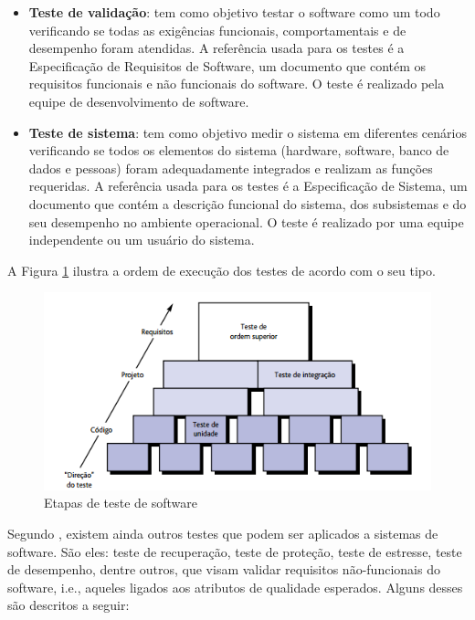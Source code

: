 \begin{itemize}
\item {\textbf{Teste de validação}}: tem como objetivo testar o software como um todo verificando se todas as exigências funcionais, comportamentais e de desempenho foram atendidas. A referência usada para os testes é a Especificação de Requisitos de Software, um documento que contém os requisitos funcionais e não funcionais do software. O teste é realizado pela equipe de desenvolvimento de software.

\item {\textbf{Teste de sistema}}: tem como objetivo medir o sistema em diferentes cenários verificando se todos os elementos do sistema (hardware, software, banco de dados e pessoas) foram adequadamente integrados e realizam as funções requeridas. A referência usada para os testes é a Especificação de Sistema, um documento que contém a descrição funcional do sistema, dos subsistemas e do seu desempenho no ambiente operacional. O teste é realizado por uma equipe independente ou um usuário do sistema.

\end{itemize}

A Figura \ref{figure:etapasteste} ilustra a ordem de execução dos testes de acordo com o seu tipo.

\begin{figure}[!htb]
\centering
\includegraphics[width=.75\textwidth]{images/etapasteste.png}
\caption{Etapas de teste de software \cite{PRESSMAN2016}}
\label{figure:etapasteste}
\end{figure}

Segundo , existem ainda outros testes que podem ser aplicados a sistemas de software. São eles: teste de recuperação, teste de proteção, teste de estresse, teste de desempenho, dentre outros, que visam validar requisitos não-funcionais do software, i.e., aqueles ligados aos atributos de qualidade esperados. Alguns desses são descritos a seguir:

